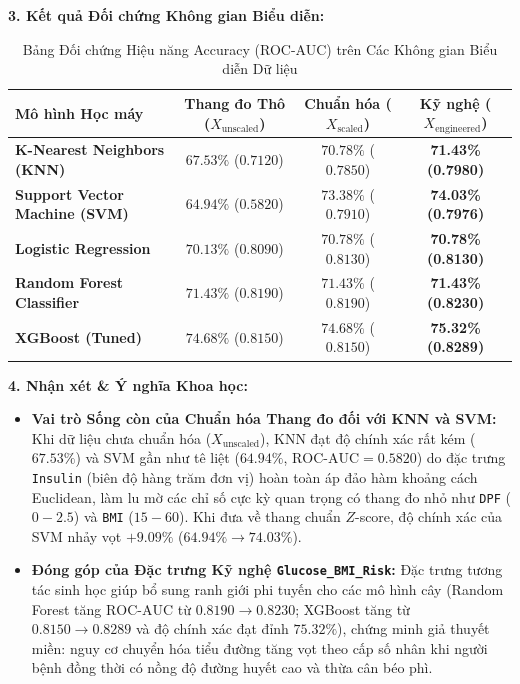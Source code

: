 \documentclass[12pt,a4paper]{report}
\begin{document}
\textbf{3. Kết quả Đối chứng Không gian Biểu diễn:}

\begin{table}[H]
\centering
\small
\setlength{\tabcolsep}{8pt}
\begin{tabular}{lccc}
\toprule
\textbf{Mô hình Học máy} & \textbf{Thang đo Thô ($X_{\text{unscaled}}$)} & \textbf{Chuẩn hóa ($X_{\text{scaled}}$)} & \textbf{Kỹ nghệ ($X_{\text{engineered}}$)} \\
\midrule
\textbf{K-Nearest Neighbors (KNN)} & $67.53\%$ ($0.7120$) & $70.78\%$ ($0.7850$) & \textbf{71.43\% (0.7980)} \\
\textbf{Support Vector Machine (SVM)} & $64.94\%$ ($0.5820$) & $73.38\%$ ($0.7910$) & \textbf{74.03\% (0.7976)} \\
\textbf{Logistic Regression} & $70.13\%$ ($0.8090$) & $70.78\%$ ($0.8130$) & \textbf{70.78\% (0.8130)} \\
\textbf{Random Forest Classifier} & $71.43\%$ ($0.8190$) & $71.43\%$ ($0.8190$) & \textbf{71.43\% (0.8230)} \\
\textbf{XGBoost (Tuned)} & $74.68\%$ ($0.8150$) & $74.68\%$ ($0.8150$) & \textbf{75.32\% (0.8289)} \\
\bottomrule
\end{tabular}
\caption{Bảng Đối chứng Hiệu năng Accuracy (ROC-AUC) trên Các Không gian Biểu diễn Dữ liệu}
\label{tab:week1_exp3}
\end{table}

\textbf{4. Nhận xét \& Ý nghĩa Khoa học:}
\begin{itemize}[leftmargin=1.5em]
    \item \textbf{Vai trò Sống còn của Chuẩn hóa Thang đo đối với KNN và SVM:}
    Khi dữ liệu chưa chuẩn hóa ($X_{\text{unscaled}}$), KNN đạt độ chính xác rất kém ($67.53\%$) và SVM gần như tê liệt ($64.94\%$, $\text{ROC-AUC} = 0.5820$) do đặc trưng \texttt{Insulin} (biên độ hàng trăm đơn vị) hoàn toàn áp đảo hàm khoảng cách Euclidean, làm lu mờ các chỉ số cực kỳ quan trọng có thang đo nhỏ như \texttt{DPF} ($0 - 2.5$) và \texttt{BMI} ($15 - 60$). Khi đưa về thang chuẩn $Z$-score, độ chính xác của SVM nhảy vọt $+9.09\%$ ($64.94\% \to 74.03\%$).
    \item \textbf{Đóng góp của Đặc trưng Kỹ nghệ \texttt{Glucose\_BMI\_Risk}:}
    Đặc trưng tương tác sinh học giúp bổ sung ranh giới phi tuyến cho các mô hình cây (Random Forest tăng $\text{ROC-AUC}$ từ $0.8190 \to 0.8230$; XGBoost tăng từ $0.8150 \to 0.8289$ và độ chính xác đạt đỉnh $75.32\%$), chứng minh giả thuyết miền: nguy cơ chuyển hóa tiểu đường tăng vọt theo cấp số nhân khi người bệnh đồng thời có nồng độ đường huyết cao và thừa cân béo phì.
\end{itemize}
\end{document}
